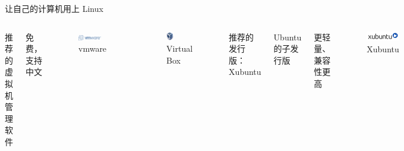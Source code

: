 \documentclass[UTF8]{ctexbeamer}
\begin{document}
\begin{frame}{让自己的计算机用上 Linux}


    \begin{columns}
    
    推荐的虚拟机管理软件
    
    免费，支持中文
    \begin{figure}
        \centering
        \includegraphics[width=0.8\textwidth]{vmware.png}
        \caption{vmware}
        \label{fig:vmware}
    \end{figure}
    
    \begin{figure}
        \centering
        \includegraphics[width=0.3\textwidth]{virtualbox.png}
        \caption{Virtual Box}
        \label{fig:virtualbox}
    \end{figure}
    
    
    推荐的发行版：Xubuntu
    
    Ubuntu 的子发行版
    
    更轻量、兼容性更高
    
    \begin{figure}
        \centering
        \includegraphics[width=\textwidth]{xubuntu.png}
        \caption{Xubuntu}
        \label{fig:xubuntu}
    \end{figure}
    \end{columns}

\end{frame}
\end{document}
